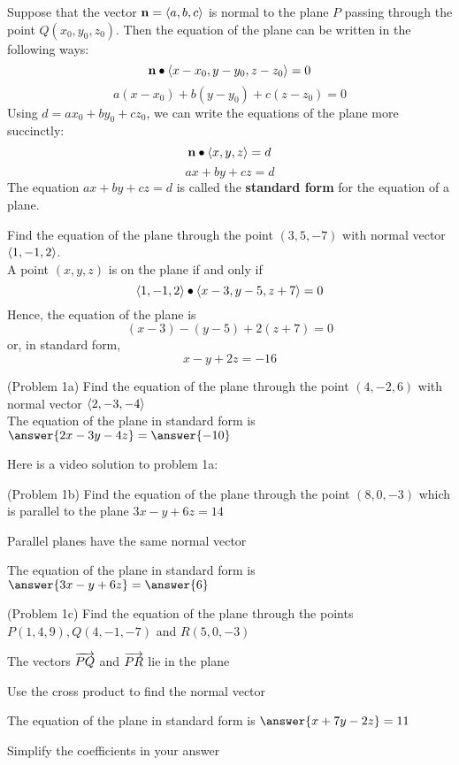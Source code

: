 \documentclass[handout]{ximera}
\begin{document}
\begin{proposition}
Suppose that the vector $\mathbf{n} = \left\langle a,b,c\right\rangle$ is normal to the plane $P$ passing through the point $Q(x_0, y_0, z_0)$.
Then the equation of the plane can be written in the following ways:
\[
\vec{n} \dotp \vector{x-x_0, y-y_0, z-z_0} = 0 %
\]
\[
a(x-x_0) + b(y-y_0) + c(z-z_0) = 0 %
\]
Using $d = ax_0 + by_0 + cz_0$,  we can write the equations of the plane more succinctly:
\[
\vec{n} \dotp \vector{x, y, z} = d %
\]
\[
ax+by+cz = d 
\]
The equation $ax+by+cz =d$ is called the \textbf{standard form} for the equation of a plane.
\end{proposition}

\begin{example}[Example 1] 
Find the equation of the plane through the point $(3, 5, -7)$ with normal vector $\left\langle 1, -1, 2\right\rangle$.\\
A point $(x, y, z)$ is on the plane if and only if 
\[
\left\langle 1, -1, 2\right\rangle \bullet \left\langle x - 3, y-5, z+7\right\rangle =0
\]
Hence, the equation of the plane is
\[
(x-3) - (y-5) + 2(z+7) = 0
\]
or, in standard form,
\[
x - y + 2z = -16
\]
\end{example}

\begin{problem}(Problem 1a)
Find the equation of the plane through the point $(4, -2, 6)$ with normal vector $\left\langle 2, -3, -4\right\rangle$\\
The equation of the plane in standard form is $\answer{2x-3y-4z} = \answer{-10}$
\end{problem}

Here is a video solution to problem 1a:\\
\begin{foldable}
\end{foldable}

\begin{problem}(Problem 1b)
Find the equation of the plane through the point $(8, 0, -3)$ which is parallel to the plane $3x - y + 6z = 14$\\
\begin{hint}
Parallel planes have the same normal vector
\end{hint}
The equation of the plane in standard form is $\answer{3x-y+6z} = \answer{6}$
\end{problem}

\begin{problem}(Problem 1c)
Find the equation of the plane through the points $P(1, 4, 9), Q(4, -1, -7)$ and $R(5, 0, -3)$\\
\begin{hint}
The vectors $\overrightarrow{PQ}$ and $\overrightarrow{PR}$ lie in the plane
\end{hint}
\begin{hint}
Use the cross product to find the normal vector
\end{hint}
The equation of the plane in standard form is $\answer{x+7y-2z} = 11$
\begin{hint}
Simplify the coefficients in your answer
\end{hint}
\end{problem}
\end{document}
